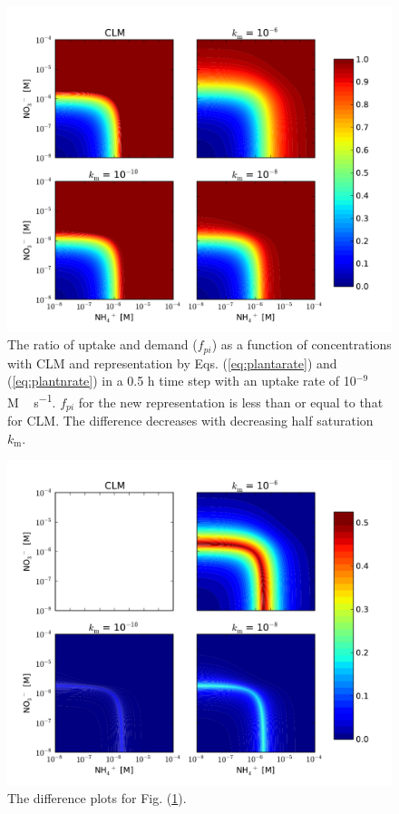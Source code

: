 \documentclass[gmd, manuscript]{copernicus}
\begin{document}
\begin{figure}[t]
\includegraphics[width=12cm]{../figs/fig05/uptakef.pdf}
\caption{The ratio of uptake and demand ($f_{pi}$) as a
function of concentrations with CLM and representation by Eqs.
(\ref{eq:plantarate}) and (\ref{eq:plantnrate}) in a 0.5 h time step with an
uptake rate of 10$^{-9}$ \unit{M\,s^{-1}}. $f_{pi}$ for the new representation
is less than or equal to that for CLM. The difference decreases with decreasing
half saturation $k_\text{m}$.}
\label{fig:demanddistribution}
\end{figure}

\begin{figure}[t]
\includegraphics[width=12cm]{../figs/fig06/uptaked.pdf}
\caption{The difference plots for Fig. (\ref{fig:demanddistribution}).}
\label{fig:demanddistributiondiff}
\end{figure}
\end{document}
